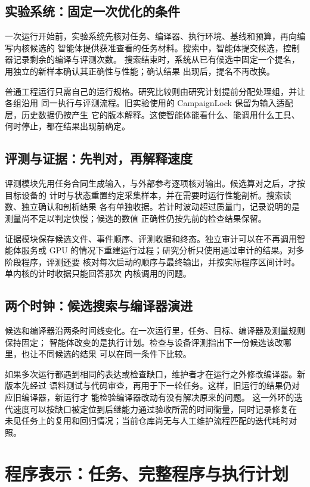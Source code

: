 \documentclass[UTF8,11pt,a4paper,fontset=none]{ctexart}
\begin{document}
\subsection{实验系统：固定一次优化的条件}
一次运行开始前，实验系统先核对任务、编译器、执行环境、基线和预算，再向编写内核候选的
智能体提供获准查看的任务材料。搜索中，智能体提交候选，控制器记录剩余的编译与评测次数。
搜索结束时，系统从已有候选中固定一个提名，用独立的新样本确认其正确性与性能；确认结果
出现后，提名不再改换。

普通工程运行只需自己的运行规格。研究比较则由研究计划提前分配处理组，并让各组沿用
同一执行与评测流程。旧实验使用的 CampaignLock 保留为输入适配层，历史数据仍按产生
它的版本解释。这使智能体能看什么、能调用什么工具、何时停止，都在结果出现前确定。

\subsection{评测与证据：先判对，再解释速度}
评测模块先用任务合同生成输入，与外部参考逐项核对输出。候选算对之后，才按目标设备的
计时与状态重置约定采集样本，并在需要时运行性能剖析。搜索读数、独立确认和剖析结果
各有单独收据。若计时波动超过质量门，记录说明的是测量尚不足以判定快慢；候选的数值
正确性仍按先前的检查结果保留。

证据模块保存候选文件、事件顺序、评测收据和终态。独立审计可以在不再调用智能体服务或
GPU 的情况下重建运行过程；研究分析只使用通过审计的结果。对多阶段程序，评测还要
核对每次启动的顺序与最终输出，并按实际程序区间计时。单内核的计时收据只能回答那次
内核调用的问题\cite{acceptance}。

\subsection{两个时钟：候选搜索与编译器演进}
候选和编译器沿两条时间线变化。在一次运行里，任务、目标、编译器及测量规则保持固定；
智能体改变的是执行计划。检查与设备评测指出下一份候选该改哪里，也让不同候选的结果
可以在同一条件下比较。

如果多次运行都遇到相同的表达或检查缺口，维护者才在运行之外修改编译器。新版本先经过
语料测试与代码审查，再用于下一轮任务。这样，旧运行的结果仍对应旧编译器，新运行才
能检验编译器改动有没有解决原来的问题\cite{architecture,acceptance}。
这一外环的迭代速度可以按缺口被定位到后继能力通过验收所需的时间衡量，同时记录修复在
未见任务上的复用和回归情况；当前仓库尚无与人工维护流程匹配的迭代耗时对照。

\section{程序表示：任务、完整程序与执行计划}
\end{document}
